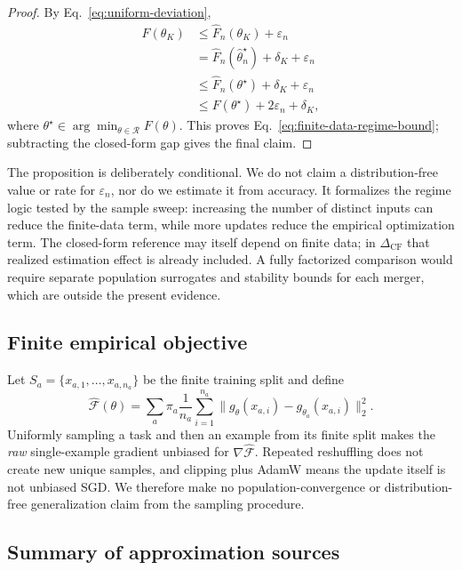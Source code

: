 \documentclass[letterpaper]{article} %
\theoremstyle{plain}
\theoremstyle{definition}
\begin{document}
\begin{proof}
By Eq.~\eqref{eq:uniform-deviation},
\begin{align*}
F(\theta_K)
&\le \widehat F_n(\theta_K)+\varepsilon_n \\
&=\widehat F_n(\widehat\theta_n^\star)+\delta_K+\varepsilon_n \\
&\le \widehat F_n(\theta^\star)+\delta_K+\varepsilon_n \\
&\le F(\theta^\star)+2\varepsilon_n+\delta_K,
\end{align*}
where $\theta^\star\in\arg\min_{\theta\in\mathcal R}F(\theta)$. This proves
Eq.~\eqref{eq:finite-data-regime-bound}; subtracting the closed-form gap gives the final
claim.
\end{proof}

The proposition is deliberately conditional. We do not claim a distribution-free value
or rate for $\varepsilon_n$, nor do we estimate it from accuracy. It formalizes the regime
logic tested by the sample sweep: increasing the number of distinct inputs can reduce the
finite-data term, while more updates reduce the empirical optimization term. The
closed-form reference may itself depend on finite data; in
$\Delta_{\mathrm{CF}}$ that realized estimation effect is already included. A fully
factorized comparison would require separate population surrogates and stability bounds
for each merger, which are outside the present evidence.

\subsection{Finite empirical objective}
\label{app:finite-data}

Let $S_a=\{x_{a,1},\ldots,x_{a,n_a}\}$ be the finite training split and define
\[
\widehat{\mathcal F}(\theta)
=\sum_a\pi_a\frac1{n_a}\sum_{i=1}^{n_a}
\|g_\theta(x_{a,i})-g_{\theta_a}(x_{a,i})\|_2^2.
\]
Uniformly sampling a task and then an example from its finite split makes the \emph{raw}
single-example gradient unbiased for $\nabla\widehat{\mathcal F}$. Repeated reshuffling
does not create new unique samples, and clipping plus AdamW means the update itself is
not unbiased SGD. We therefore make no population-convergence or distribution-free
generalization claim from the sampling procedure.

\subsection{Summary of approximation sources}
\label{app:theory-summary}
\end{document}
